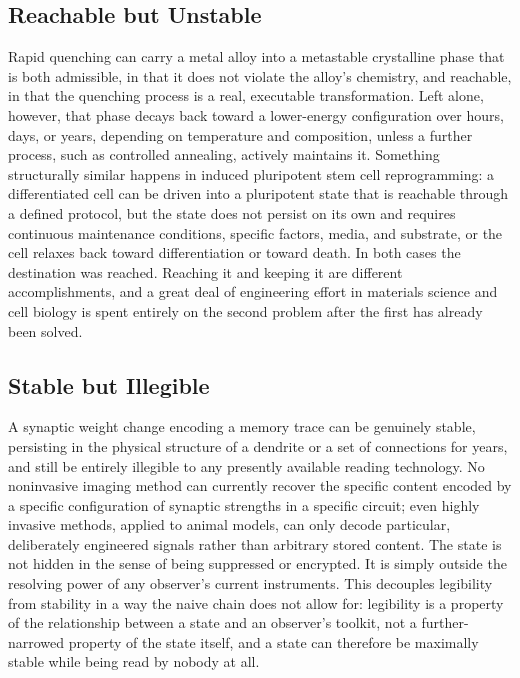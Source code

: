 \documentclass[11pt]{book}
\begin{document}
\subsection{Reachable but Unstable}

Rapid quenching can carry a metal alloy into a metastable crystalline phase that is both admissible, in that it does not violate the alloy's chemistry, and reachable, in that the quenching process is a real, executable transformation. Left alone, however, that phase decays back toward a lower-energy configuration over hours, days, or years, depending on temperature and composition, unless a further process, such as controlled annealing, actively maintains it. Something structurally similar happens in induced pluripotent stem cell reprogramming: a differentiated cell can be driven into a pluripotent state that is reachable through a defined protocol, but the state does not persist on its own and requires continuous maintenance conditions, specific factors, media, and substrate, or the cell relaxes back toward differentiation or toward death. In both cases the destination was reached. Reaching it and keeping it are different accomplishments, and a great deal of engineering effort in materials science and cell biology is spent entirely on the second problem after the first has already been solved.

\subsection{Stable but Illegible}

A synaptic weight change encoding a memory trace can be genuinely stable, persisting in the physical structure of a dendrite or a set of connections for years, and still be entirely illegible to any presently available reading technology. No noninvasive imaging method can currently recover the specific content encoded by a specific configuration of synaptic strengths in a specific circuit; even highly invasive methods, applied to animal models, can only decode particular, deliberately engineered signals rather than arbitrary stored content. The state is not hidden in the sense of being suppressed or encrypted. It is simply outside the resolving power of any observer's current instruments. This decouples legibility from stability in a way the naive chain does not allow for: legibility is a property of the relationship between a state and an observer's toolkit, not a further-narrowed property of the state itself, and a state can therefore be maximally stable while being read by nobody at all.
\end{document}
